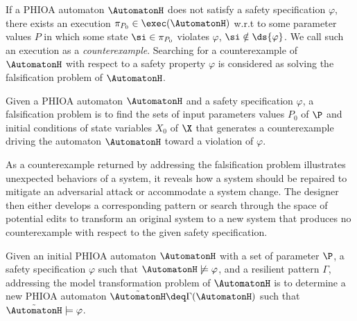 If a PHIOA automaton $\AutomatonH$ does not satisfy a safety specification $\varphi$, there exists an execution $\pi_{P_0} \in \exec(\AutomatonH)$ w.r.t to some parameter values $P$ in which some state $\si \in \pi_{P_0}$ violates $\varphi$, \ie $\si \notin \ds{\varphi}$. We call such an execution as a \emph{counterexample}. Searching for a counterexample of $\AutomatonH$ with respect to a safety property $\varphi$ is considered as solving the falsification problem of $\AutomatonH$.
 

\begin{definition}
Given a PHIOA automaton $\AutomatonH$ and a safety specification $\varphi$, a falsification problem is to find the sets of input parameters values $P_0$ of $\P$ and initial conditions of state variables $X_0$ of $\X$ that generates a counterexample driving the automaton $\AutomatonH$ toward a violation of $\varphi$.
\end{definition}

As a counterexample returned by addressing the falsification problem illustrates unexpected behaviors of a system, it reveals how a system should be repaired to mitigate an adversarial attack or accommodate a system change. The designer then either develops a corresponding pattern or search through the space of potential edits to transform an original system to a new system that produces no counterexample with respect to the given safety specification. %

\begin{definition}
Given an initial PHIOA automaton $\AutomatonH$ with a set of parameter $\P$, a safety specification $\varphi$ such that $\AutomatonH \not\models \varphi$, and a resilient pattern $\Gamma$, addressing the model transformation problem of $\AutomatonH$ is to determine a new PHIOA automaton $\tilde{\AutomatonH} \deq \Gamma(\AutomatonH)$ such that $\tilde{\AutomatonH}\models\varphi$.
\end{definition}



